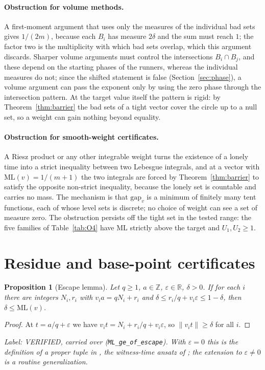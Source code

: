 \documentclass[11pt]{article}
\newtheorem{proposition}[theorem]{Proposition}
\theoremstyle{remark}
\newcommand{\norm}[1]{\lVert #1\rVert}
\newcommand{\ML}{\mathrm{ML}}
\newcommand{\gap}{\mathrm{gap}}
\newcommand{\Z}{\mathbb{Z}}
\newcommand{\R}{\mathbb{R}}
\newcommand{\lab}[1]{\par\smallskip\noindent\textit{Label: #1.}}
\begin{document}
\paragraph{Obstruction for volume methods.} A first-moment argument that uses only the measures of the individual bad sets gives $1/(2m)$, because each $B_i$ has measure $2\delta$ and the sum must reach $1$; the factor two is the multiplicity with which bad sets overlap, which this argument discards. Sharper volume arguments must control the intersections $B_i\cap B_j$, and these depend on the starting phases of the runners, whereas the individual measures do not; since the shifted statement is false (Section~\ref{sec:phase}), a volume argument can pass the exponent only by using the zero phase through the intersection pattern. At the target value itself the pattern is rigid: by Theorem~\ref{thm:barrier} the bad sets of a tight vector cover the circle up to a null set, so a weight can gain nothing beyond equality.

\paragraph{Obstruction for smooth-weight certificates.} A Riesz product or any other integrable weight turns the existence of a lonely time into a strict inequality between two Lebesgue integrals, and at a vector with $\ML(v)=1/(m+1)$ the two integrals are forced by Theorem~\ref{thm:barrier} to satisfy the opposite non-strict inequality, because the lonely set is countable and carries no mass. The mechanism is that $\gap_v$ is a minimum of finitely many tent functions, each of whose level sets is discrete; no choice of weight can see a set of measure zero. The obstruction persists off the tight set in the tested range: the five families of Table~\ref{tab:O4} have $\ML$ strictly above the target and $U_1,U_2\ge1$.

\section{Residue and base-point certificates}\label{sec:residue}

\begin{proposition}[Escape lemma]\label{prop:escape}
Let $q\ge1$, $a\in\Z$, $\varepsilon\in\R$, $\delta>0$. If for each $i$ there are integers $N_i,r_i$ with $v_ia=qN_i+r_i$ and $\delta\le r_i/q+v_i\varepsilon\le1-\delta$, then $\delta\le\ML(v)$.
\end{proposition}
\begin{proof} At $t=a/q+\varepsilon$ we have $v_it=N_i+r_i/q+v_i\varepsilon$, so $\norm{v_it}\ge\delta$ for all $i$.\end{proof}
\lab{VERIFIED, carried over (\texttt{ML\_ge\_of\_escape}). With $\varepsilon=0$ this is the definition of a proper tuple in \cite[Def.~3]{Trak26}, the witness-time ansatz of \cite{Rosenfeld25}; the extension to $\varepsilon\ne0$ is a routine generalization}
\end{document}
